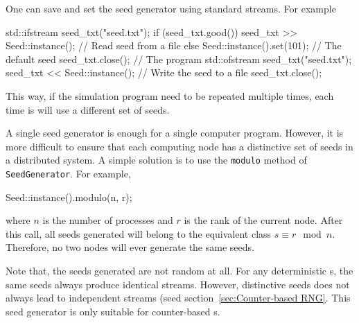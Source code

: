 One can save and set the seed generator using standard \cpp streams. For
example
\begin{cppcode}
  std::ifstream seed_txt("seed.txt");
  if (seed_txt.good())
      seed_txt >> Seed::instance(); // Read seed from a file
  else
      Seed::instance().set(101);    // The default seed
  seed_txt.close();
  // The program
  std::ofstream seed_txt("seed.txt");
  seed_txt << Seed::instance();     // Write the seed to a file
  seed_txt.close();
\end{cppcode}
This way, if the simulation program need to be repeated multiple times, each
time is will use a different set of seeds.

A single seed generator is enough for a single computer program. However, it is
more difficult to ensure that each computing node has a distinctive set of
seeds in a distributed system. A simple solution is to use the \verb|modulo|
method of \verb|SeedGenerator|. For example,
\begin{cppcode}
  Seed::instance().modulo(n, r);
\end{cppcode}
where $n$ is the number of processes and $r$ is the rank of the current node.
After this call, all seeds generated will belong to the equivalent class $s
\equiv r \mod n$. Therefore, no two nodes will ever generate the same seeds.

Note that, the seeds generated are not random at all. For any deterministic
\rng{}s, the same seeds always produce identical streams. However, distinctive
seeds does not always lead to independent streams (seed
section~\ref{sec:Counter-based RNG}. This seed generator is only suitable for
counter-based \rng{}s.
